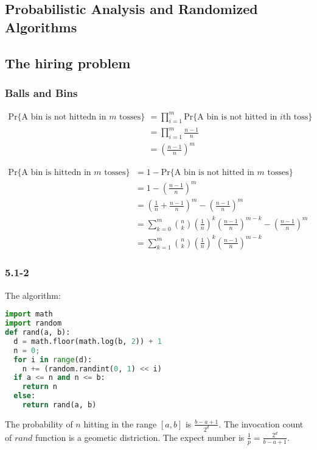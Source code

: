 \documentclass{book}
\begin{document}
\begin{CJK}{UTF8}{gkai}
\chapter{Probabilistic Analysis and Randomized Algorithms}

\section{The hiring problem}

\subsection*{Balls and Bins}

\begin{align*}
  \text{Pr\{A bin is not hittedn in $m$ tosses\}} & = \prod_{i = 1}^{m} 
  \text{Pr\{A bin is not hitted in $i$th toss\}} \\
  & = \prod_{i = 1}^{m}\frac{n-1}{n} \\
  & = \left(\frac{n-1}{n}\right)^m
\end{align*}

\begin{align*}
  \text{Pr\{A bin is  hittedn in $m$ tosses\}} & = 1 - \text{Pr\{A bin is not 
  hitted in $m$ tosses\}} \\
  & = 1 - \left(\frac{n-1}{n}\right)^m \\
  & = \left(\frac{1}{n} + \frac{n-1}{n}\right)^m - \left(\frac{n-1}{n}\right)^m \\
  & = \sum_{k=0}^{m}\binom{n}{k}\left(\frac{1}{n}\right)^k 
  \left(\frac{n-1}{n}\right)^{m-k} - \left(\frac{n-1}{n}\right)^m \\
  & = \sum_{k=1}^{m}\binom{n}{k}\left(\frac{1}{n}\right)^k 
  \left(\frac{n-1}{n}\right)^{m-k}
\end{align*}

\subsection*{5.1-2}
The algorithm:
\begin{lstlisting}[language=Python]
import math
import random
def rand(a, b):
  d = math.floor(math.log(b, 2)) + 1
  n = 0;
  for i in range(d):
    n += (random.randint(0, 1) << i)
  if a <= n and n <= b:
    return n
  else:
    return rand(a, b)
\end{lstlisting}

The probability of $n$ hitting in the range $[a, b]$ is $\frac{b-a+1}{2^d}$. The 
invocation count of $rand$ function is a geometic distriction. The expect number 
is $\frac{1}{p} = \frac{2^d}{b-a+1}$.


\end{CJK}
\end{document}

